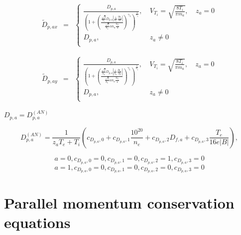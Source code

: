 \documentclass[a4paper,10pt]{report}
\begin{document}
\begin{equation}
\begin{matrix}
\widetilde D_{p,ax} & =
& \left\{
\begin{matrix}
\frac{D_{p,a}}
{\left(1+\left(\frac{\frac{\sqrt{g}}{h_x} D_{p,a} \left| \frac{1}{h_x} \frac{\partial p_a}{\partial x} \right| }{\frac{\sqrt{g}}{h_x} \mathit{\alpha n}_a \frac{V_{T_i}} 4} \right)^{\gamma _1} \right)^{\frac 1{\gamma_1}}},
& \ V_{T_i}=\sqrt{\frac{8T_i}{\mathit{\pi m}_a}}, & \ z_a = 0 \\
D_{p,a}, & \ z_a \neq 0 \\
\end{matrix} \right.
\end{matrix}
\end{equation}

\begin{equation}
\begin{matrix}
\widetilde D_{p,ay} & =
& \left\{
\begin{matrix}
\frac{D_{p,a}}
{\left(1+\left(\frac{\frac{\sqrt{g}}{h_y} D_{p,a} \left| \frac 1{h_y}\frac{\partial p_a}{\partial y} \right| }{\frac{\sqrt{g}}{h_x} \mathit{\alpha n}_a\frac{V_{T_i}} 4}\right)^{\gamma _1}\right)^{\frac 1{\gamma_1}}},
& \ V_{T_i}=\sqrt{\frac{8T_i}{\mathit{\pi m}_a}}, & \ z_a = 0 \\
D_{p,a}, & \ z_a \neq 0 \\
\end{matrix} \right.
\end{matrix}
\end{equation}

$D_{p,a} = D^{(AN)}_{p,a}$

\begin{equation*}
D^{(AN)}_{p,a}=\frac 1{z_aT_e+T_i} \left( c_{D_{p,a},0} + c_{D_{p,a},1} \frac{10^{20}}{n_e} + c_{D_{p,a},2} D_{f,a} + c_{D_{p,a},3} \frac{T_e}{16 e|B|}\right),
\end{equation*}

\begin{equation*}
a=0,c_{D_{p,a},0}=0, c_{D_{p,a},1}=0, c_{D_{p,a},2}=1, c_{D_{p,a},3}=0
\end{equation*}
\begin{equation*}
a=1, c_{D_{p,a},0}=0, c_{D_{p,a},1}=0, c_{D_{p,a},2}=0, c_{D_{p,a},3}=0
\end{equation*}

\section{Parallel momentum conservation equations}
\end{document}
